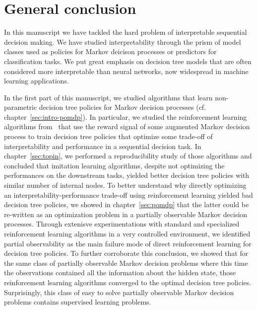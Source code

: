 \chapter*{General conclusion}
In this manuscript we have tackled the hard problem of interpretable sequential decision making.
We have studied interpretability through the prism of model classes used as policies for Markov deicison processes or predictors for classification tasks.
We put great emphasis on decision tree models that are often considered more interpretable than neural networks, now widespread in machine learning applications.

In the first part of this manuscript, we studied algorithms that learn non-parametric decision tree policies for Markov decision processes (cf. chapter~\ref{sec:intro-pomdp}).
In particular, we studied the reinforcement learning algorithms from~\cite{topin2021iterative} that use the reward signal of some augmented Markov decision process to train decision tree policies that optimize some trade-off of interpretability and performance in a sequential decision task.
In chapter~\ref{sec:topin}, we performed a reproducibility study of those algorithms and concluded that imitation learning algorithms, despite not optimizing the performances on the downstream tasks, yielded better decision tree policies with similar number of internal nodes.
To better understand why directly optimizing an interpretability-performance trade-off using reinforcement learning yielded bad decision tree policies, we showed in chapter~\ref{sec:pomdp} that the latter could be re-written as an optimization problem in a partially observable Markov decision processes.
Through extenisve experimentations with standard and specialized reinforcement learning algorithms in a very controlled environment, we identified partial observability as the main failure mode of direct reinforcement learning for decision tree policies.
To further corroborate this conclusion, we showed that for the same class of partially observable Markov decision problems where this time the observations contained all the information about the hidden state, those reinforcement learning algorithms converged to the optimal decision tree policies.
Surprisingly, this class of easy to solve partially observable Markov decision problems contains supervised learning problems.

